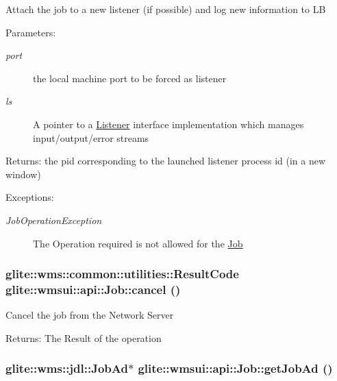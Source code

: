 Attach the job to a new listener (if possible) and log new information to LB \begin{Desc}
\item[Parameters:]
\begin{description}
\item[{\em port}]the local machine port to be forced as listener \item[{\em ls}]A pointer to a \hyperlink{classglite_1_1wmsui_1_1api_1_1Listener}{Listener} interface implementation which manages input/output/error streams \end{description}
\end{Desc}
\begin{Desc}
\item[Returns:]the pid corresponding to the launched listener process id (in a new window) \end{Desc}
\begin{Desc}
\item[Exceptions:]
\begin{description}
\item[{\em Job\-Operation\-Exception}]The Operation required is not allowed for the \hyperlink{classglite_1_1wmsui_1_1api_1_1Job}{Job} \end{description}
\end{Desc}
\hypertarget{classglite_1_1wmsui_1_1api_1_1Job_z23_3}{
\subsubsection[cancel]{\setlength{\rightskip}{0pt plus 5cm}glite::wms::common::utilities::Result\-Code glite::wmsui::api::Job::cancel ()}}
\label{classglite_1_1wmsui_1_1api_1_1Job_z23_3}


Cancel the job from the Network Server \begin{Desc}
\item[Returns:]The Result of the operation \end{Desc}
\hypertarget{classglite_1_1wmsui_1_1api_1_1Job_z17_1}{
\subsubsection[getJobAd]{\setlength{\rightskip}{0pt plus 5cm}glite::wms::jdl::Job\-Ad$\ast$ glite::wmsui::api::Job::get\-Job\-Ad ()}}
\label{classglite_1_1wmsui_1_1api_1_1Job_z17_1}


